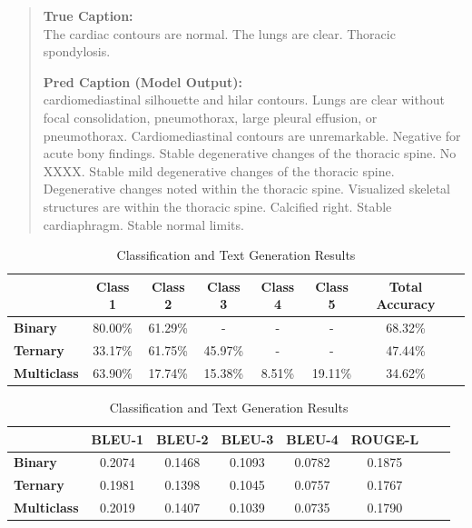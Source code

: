 \documentclass[a4paper,12pt]{article}
\begin{document}
\begin{quote}
    \textbf{True Caption:}\\
    The cardiac contours are normal. The lungs are clear. Thoracic spondylosis.
    
    \medskip
    
    \textbf{Pred Caption (Model Output):}\\
    cardiomediastinal silhouette and hilar contours. Lungs are clear without focal consolidation, pneumothorax, large pleural effusion, or pneumothorax. Cardiomediastinal contours are unremarkable. Negative for acute bony findings. Stable degenerative changes of the thoracic spine. No XXXX. Stable mild degenerative changes of the thoracic spine. Degenerative changes noted within the thoracic spine. Visualized skeletal structures are within the thoracic spine. Calcified right. Stable cardiaphragm. Stable normal limits.
\end{quote}

\newpage

\begin{table}[H]
    \centering
    \begin{tabular}{lccccccc}
    \toprule
     & \textbf{Class 1} & \textbf{Class 2} & \textbf{Class 3} & \textbf{Class 4} & \textbf{Class 5} & \textbf{Total Accuracy} \\
    \midrule
    \textbf{Binary}         & 80.00\% & 61.29\% & - & - & - & 68.32\% \\ 
    \textbf{Ternary}        & 33.17\% & 61.75\% & 45.97\% & - & - & 47.44\% \\ 
    \textbf{Multiclass}     & 63.90\% & 17.74\% & 15.38\% & 8.51\% & 19.11\% & 34.62\% \\ 
    \bottomrule
    \end{tabular}
    \caption{Classification and Text Generation Results}
    \label{tab:classification_textgen_results}
\end{table}
\begin{table}[H]
    \centering
    \begin{tabular}{lccccccc}
    \toprule
     & \textbf{BLEU-1} & \textbf{BLEU-2} & \textbf{BLEU-3} & \textbf{BLEU-4} & \textbf{ROUGE-L} \\
    \midrule
    \textbf{Binary}         & 0.2074 & 0.1468 & 0.1093 & 0.0782 & 0.1875 \\
    \textbf{Ternary}        & 0.1981 & 0.1398 & 0.1045 & 0.0757 & 0.1767 \\
    \textbf{Multiclass}     & 0.2019 & 0.1407 & 0.1039 & 0.0735 & 0.1790 \\
    \bottomrule
    \end{tabular}
    \caption{Classification and Text Generation Results}
    \label{tab:classification_textgen_results}
\end{table}
\end{document}
